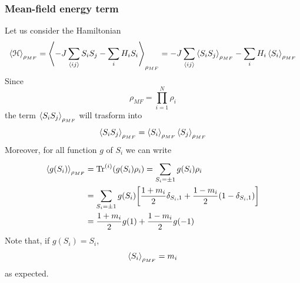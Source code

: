 \documentclass[../main/main.tex]{subfiles}
\begin{document}
\subsubsection{Mean-field energy term}
Let us consider the Hamiltonian
\begin{equation}
  \expval{\mathcal{H}}_{\rho _{MF}} = \expval{-J \sum_{\expval{ij} }^{} S_i S_j - \sum_{i}^{} H_i S_i   }_{\rho _{MF}}
  = - J   \sum_{\expval{ij} }^{} \expval{S_i S_j}_{\rho _{MF}} - \sum_{i}^{} H_i \expval{S_i}_{\rho _{MF}}
\end{equation}
Since
\begin{equation}
  \rho _{MF} = \prod_{i=1}^{N} \rho _i
\end{equation}
the term \( \expval{S_i S_j}_{\rho _{MF}}  \)  will trasform into
\begin{equation}
  \expval{S_i S_j}_{\rho _{MF}} = \expval{S_i}_{\rho _{MF}} \expval{S_j}_{\rho _{MF}}
\end{equation}
Moreover, for all function \( g \) of \( S_i \) we can write
\begin{equation}
\begin{split}
  \expval{g(S_i)}_{\rho _{MF}} &= \Tr^{(i)}(g(S_i)\rho _i) = \sum_{S_i = \pm 1}^{} g(S_i) \rho _i    \\
  &= \sum_{S_i = \pm 1}^{} g(S_i) \qty[\frac{1+m_i}{2} \delta _{S_i,1} + \frac{1-m_i}{2} (1- \delta _{S_i,1})  ] \\
  & = \frac{1+m_i}{2}g(1) + \frac{1-m_i}{2} g(-1)
\end{split}
\end{equation}
Note that, if \( g(S_i) = S_i \),
\begin{equation*}
  \expval{S_i}_{\rho _{MF}} = m_i
\end{equation*}
as expected.
\end{document}
